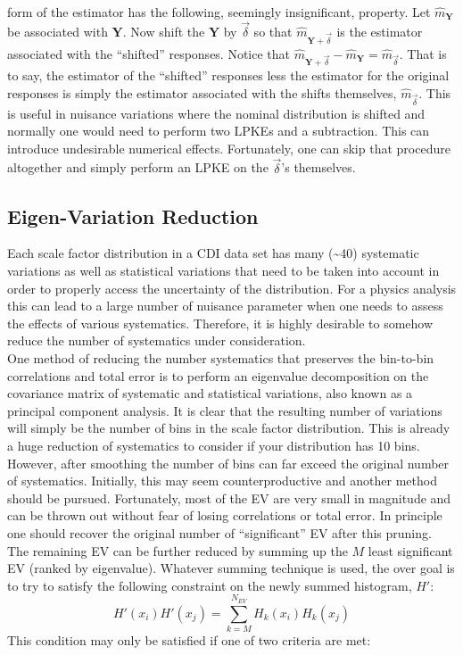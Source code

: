 form of the estimator has the following, seemingly insignificant,
property. Let $\hat{m}_{\mathbf{Y}}$ be associated with $\mathbf{Y}$.
Now shift the $\mathbf{Y}$ by $\overrightarrow{\delta}$ so that
$\hat{m}_{\mathbf{Y}+\overrightarrow{\delta}}$ is the estimator
associated with the ``shifted'' responses. Notice that
$\hat{m}_{\mathbf{Y}+\overrightarrow{\delta}}-\hat{m}_{\mathbf{Y}}= \hat{m}_{\overrightarrow{\delta}}$.
That is to say, the estimator of the ``shifted'' responses less the
estimator for the original responses is simply the estimator associated
with the shifts themselves, $\hat{m}_{\overrightarrow{\delta}}$. This is
useful in nuisance variations where the nominal distribution is shifted
and normally one would need to perform two LPKEs and a subtraction. This
can introduce undesirable numerical effects. Fortunately, one can skip
that procedure altogether and simply perform an LPKE on the
$\overrightarrow{\delta}$'s themselves.

\subsection{Eigen-Variation Reduction}\label{eigen-variation-reduction}

Each scale factor distribution in a CDI data set has many
(\textasciitilde{}40) systematic variations as well as statistical
variations that need to be taken into account in order to properly
access the uncertainty of the distribution. For a physics analysis this
can lead to a large number of nuisance parameter when one needs to
assess the effects of various systematics. Therefore, it is highly
desirable to somehow reduce the number of systematics under
consideration.\\One method of reducing the number systematics that
preserves the bin-to-bin correlations and total error is to perform an
eigenvalue decomposition on the covariance matrix of systematic and
statistical variations, also known as a principal component analysis. It
is clear that the resulting number of variations will simply be the
number of bins in the scale factor distribution. This is already a huge
reduction of systematics to consider if your distribution has 10 bins.
However, after smoothing the number of bins can far exceed the original
number of systematics. Initially, this may seem counterproductive and
another method should be pursued. Fortunately, most of the EV are very
small in magnitude and can be thrown out without fear of losing
correlations or total error. In principle one should recover the
original number of ``significant'' EV after this pruning. The remaining
EV can be further reduced by summing up the $M$ least significant EV
(ranked by eigenvalue). Whatever summing technique is used, the over
goal is to try to satisfy the following constraint on the newly summed
histogram, $H'$: \[
H'(x_i)H'(x_j)=\sum_{k=M}^{N_{EV}}H_k(x_i)H_k(x_j)
\] This condition may only be satisfied if one of two criteria are met:

